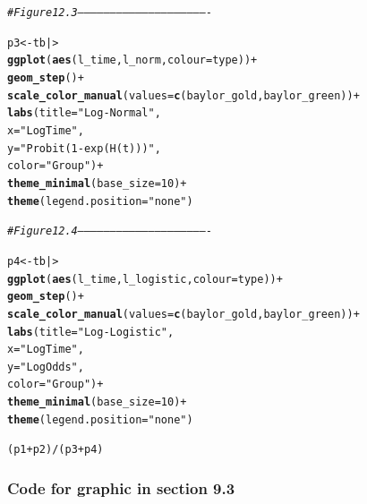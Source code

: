 \documentclass[10pt]{article}\usepackage[]{graphicx}\usepackage[]{xcolor}
\makeatletter
\newcommand{\hlnum}[1]{\textcolor[rgb]{0.686,0.059,0.569}{#1}}%
\newcommand{\hlsng}[1]{\textcolor[rgb]{0.192,0.494,0.8}{#1}}%
\newcommand{\hlcom}[1]{\textcolor[rgb]{0.678,0.584,0.686}{\textit{#1}}}%
\newcommand{\hlopt}[1]{\textcolor[rgb]{0,0,0}{#1}}%
\newcommand{\hldef}[1]{\textcolor[rgb]{0.345,0.345,0.345}{#1}}%
\newcommand{\hlkwb}[1]{\textcolor[rgb]{0.69,0.353,0.396}{#1}}%
\newcommand{\hlkwc}[1]{\textcolor[rgb]{0.333,0.667,0.333}{#1}}%
\newcommand{\hlkwd}[1]{\textcolor[rgb]{0.737,0.353,0.396}{\textbf{#1}}}%
\newenvironment{kframe}{%
 \def\at@end@of@kframe{}%
 \ifinner\ifhmode%
  \def\at@end@of@kframe{\end{minipage}}%
  \begin{minipage}{\columnwidth}%
 \fi\fi%
 \def\FrameCommand##1{\hskip\@totalleftmargin \hskip-\fboxsep
 \colorbox{shadecolor}{##1}\hskip-\fboxsep
     \hskip-\linewidth \hskip-\@totalleftmargin \hskip\columnwidth}%
 \MakeFramed {\advance\hsize-\width
   \@totalleftmargin\z@ \linewidth\hsize
   \@setminipage}}%
 {\par\unskip\endMakeFramed%
 \at@end@of@kframe}
\newenvironment{knitrout}{}{} %
\theoremstyle{definition}
\numberwithin{equation}{subsection}
\numberwithin{figure}{section}
\numberwithin{table}{subsection}
\numberwithin{Report}{section}
\numberwithin{Example}{subsection}
\makeatother
\begin{document}
\begin{knitrout}
\begin{kframe}
\begin{alltt}
\hlcom{# Figure 12.3 -------------------------------------------------------------}

\hldef{p3} \hlkwb{<-} \hldef{tb |>}
  \hlkwd{ggplot}\hldef{(}\hlkwd{aes}\hldef{(l_time, l_norm,} \hlkwc{colour} \hldef{= type))} \hlopt{+}
  \hlkwd{geom_step}\hldef{()} \hlopt{+}
  \hlkwd{scale_color_manual}\hldef{(}\hlkwc{values} \hldef{=} \hlkwd{c}\hldef{(baylor_gold, baylor_green))} \hlopt{+}
  \hlkwd{labs}\hldef{(}\hlkwc{title} \hldef{=} \hlsng{"Log-Normal"}\hldef{,}
       \hlkwc{x} \hldef{=} \hlsng{"Log Time"}\hldef{,}
       \hlkwc{y} \hldef{=} \hlsng{"Probit(1 - exp(H(t)))"}\hldef{,}
       \hlkwc{color} \hldef{=} \hlsng{"Group"}\hldef{)} \hlopt{+}
  \hlkwd{theme_minimal}\hldef{(}\hlkwc{base_size} \hldef{=} \hlnum{10}\hldef{)} \hlopt{+}
  \hlkwd{theme}\hldef{(}\hlkwc{legend.position} \hldef{=} \hlsng{"none"}\hldef{)}


\hlcom{# Figure 12.4 -------------------------------------------------------------}

\hldef{p4} \hlkwb{<-} \hldef{tb |>}
  \hlkwd{ggplot}\hldef{(}\hlkwd{aes}\hldef{(l_time, l_logistic,} \hlkwc{colour} \hldef{= type))} \hlopt{+}
  \hlkwd{geom_step}\hldef{()} \hlopt{+}
  \hlkwd{scale_color_manual}\hldef{(}\hlkwc{values} \hldef{=} \hlkwd{c}\hldef{(baylor_gold, baylor_green))} \hlopt{+}
  \hlkwd{labs}\hldef{(}\hlkwc{title} \hldef{=} \hlsng{"Log-Logistic"}\hldef{,}
       \hlkwc{x} \hldef{=} \hlsng{"Log Time"}\hldef{,}
       \hlkwc{y} \hldef{=} \hlsng{"Log Odds"}\hldef{,}
       \hlkwc{color} \hldef{=} \hlsng{"Group"}\hldef{)} \hlopt{+}
  \hlkwd{theme_minimal}\hldef{(}\hlkwc{base_size} \hldef{=} \hlnum{10}\hldef{)} \hlopt{+}
  \hlkwd{theme}\hldef{(}\hlkwc{legend.position} \hldef{=} \hlsng{"none"}\hldef{)}

\hldef{(p1} \hlopt{+} \hldef{p2)} \hlopt{/} \hldef{(p3} \hlopt{+} \hldef{p4)}
\end{alltt}
\end{kframe}
\end{knitrout}

\subsubsection{Code for graphic in section 9.3}
\end{document}
